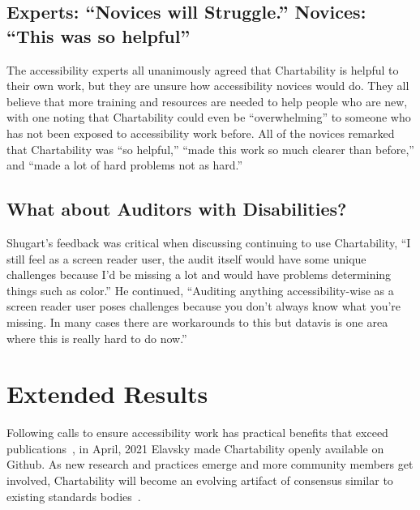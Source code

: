 \documentclass{egpubl}
\begin{document}
\subsection{Experts: ``Novices will Struggle.'' Novices: ``This was so helpful''}
The accessibility experts all unanimously agreed that Chartability is helpful to their own work, but they are unsure how accessibility novices would do. They all believe that more training and resources are needed to help people who are new, with one noting that Chartability could even be ``overwhelming'' to someone who has not been exposed to accessibility work before. All of the novices remarked that Chartability was ``so helpful,'' ``made this work so much clearer than before,'' and ``made a lot of hard problems not as hard.''

\subsection{What about Auditors with Disabilities?}
Shugart’s feedback was critical when discussing continuing to use Chartability, ``I still feel as a screen reader user, the audit itself would have some unique challenges because I’d be missing a lot and would have problems determining things such as color.'' He continued, ``Auditing anything accessibility-wise as a screen reader user poses challenges because you don’t always know what you’re missing. In many cases there are workarounds to this but datavis is one area where this is really hard to do now.'' 

\section{Extended Results}
Following calls to ensure accessibility work has practical benefits that exceed publications~\cite{hurst_making_2013}, in April, 2021 Elavsky made Chartability openly available on Github. As new research and practices emerge and more community members get involved, Chartability will become an evolving artifact of consensus similar to existing standards bodies~\cite{noauthor_w3c_nodate}.
\end{document}
